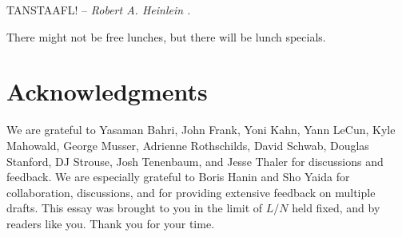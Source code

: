 \documentclass[12pt]{article}
\begin{document}
\epigraph{TANSTAAFL! -- \emph{Robert A. Heinlein \cite{heinlein}.}}{}\vspace{-1\baselineskip}


\noindent{}There might not be free lunches, but there will be lunch specials. 



\section*{Acknowledgments}
We are grateful to Yasaman Bahri, John Frank, Yoni Kahn, Yann LeCun, Kyle Mahowald, George Musser, Adrienne Rothschilds, David Schwab, Douglas Stanford, DJ Strouse, Josh Tenenbaum, and Jesse Thaler for discussions and feedback. We are especially grateful to Boris Hanin and Sho Yaida for collaboration, discussions, and for providing extensive feedback on multiple drafts.
This essay was brought to you in the limit of $L/N$ held fixed, and 
by readers like you.
Thank you for your time.








{}
\end{document}
